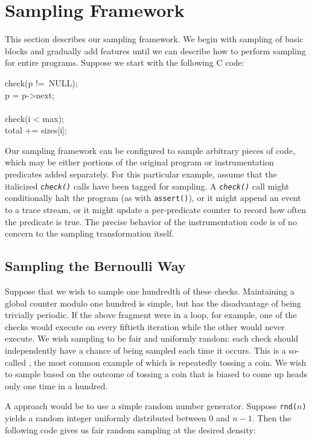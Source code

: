 \section{Sampling Framework}
\label{sec:framework}

This section describes our sampling framework.  We begin with sampling
of basic blocks and gradually add features until we can describe how
to perform sampling for entire programs.  Suppose we start with the
following C code:

\begin{code}
  check(p !=\ NULL); \\
  \up p = p->next; \\
  \\
  check(i < max); \\
  \up total += sizes[i];
\end{code}

Our sampling framework can be configured to sample arbitrary pieces of
code, which may be either portions of the original program or
instrumentation predicates added separately.  For this particular
example, assume that the italicized \texttt{\textit{check()}} calls
have been tagged for sampling.  A \texttt{\textit{check()}} call might
conditionally halt the program (as with \texttt{assert()}), or it
might append an event to a trace stream, or it might update a
per-predicate counter to record how often the predicate is true.  The
precise behavior of the instrumentation code is of no concern to the
sampling transformation itself.

\subsection{Sampling the Bernoulli Way}

Suppose that we wish to sample one hundredth of these checks.
Maintaining a global counter modulo one hundred is simple, but has the
disadvantage of being trivially periodic.  If the above fragment were
in a loop, for example, one of the checks would execute on every
fiftieth iteration while the other would never execute.  We wish
sampling to be fair and uniformly random: each check should
independently have a  chance of being sampled each
time it occurs.  This is a so-called , the
most common example of which is repeatedly tossing a coin.  We wish to
sample based on the outcome of tossing a coin that is biased to come
up heads only one time in a hundred.

A \naive approach would be to use a simple random number generator.
Suppose \texttt{rnd($n$)} yields a random integer uniformly
distributed between 0 and $n-1$.  Then the following code gives us
fair random sampling at the desired density:

